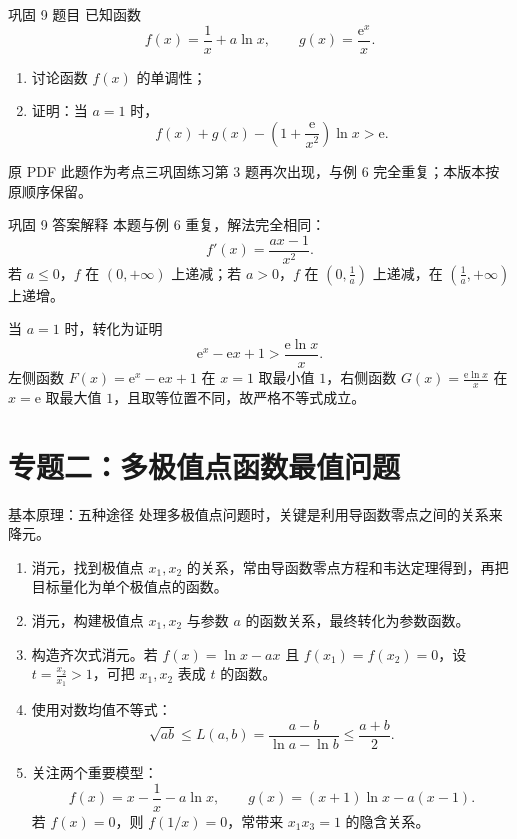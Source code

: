 ﻿\documentclass[aspectratio=169,10pt]{ctexbeamer}
\newcommand{\e}{\mathrm e}
\newcommand{\ocrnote}[1]{\par\medskip{\color{Warn}\bfseries 原文校验说明：}#1}
\begin{document}
\begin{frame}{巩固 9 题目}
\small
已知函数
\[
f(x)=\frac1x+a\ln x,\qquad g(x)=\frac{\e^x}{x}.
\]
\begin{enumerate}
  \item 讨论函数 $f(x)$ 的单调性；
  \item 证明：当 $a=1$ 时，
  \[
  f(x)+g(x)-\left(1+\frac{\e}{x^2}\right)\ln x>\e.
  \]
\end{enumerate}
\ocrnote{原 PDF 此题作为考点三巩固练习第 3 题再次出现，与例 6 完全重复；本版本按原顺序保留。}
\end{frame}

\begin{frame}{巩固 9 答案解释}
\small
本题与例 6 重复，解法完全相同：
\[
f'(x)=\frac{ax-1}{x^2}.
\]
若 $a\le0$，$f$ 在 $(0,+\infty)$ 上递减；若 $a>0$，$f$ 在 $(0,\frac1a)$ 上递减，在 $(\frac1a,+\infty)$ 上递增。

当 $a=1$ 时，转化为证明
\[
\e^x-\e x+1>\frac{\e\ln x}{x}.
\]
左侧函数 $F(x)=\e^x-\e x+1$ 在 $x=1$ 取最小值 $1$，右侧函数 $G(x)=\frac{\e\ln x}{x}$ 在 $x=\e$ 取最大值 $1$，且取等位置不同，故严格不等式成立。
\end{frame}

\section{专题二：多极值点函数最值问题}

\begin{frame}[allowframebreaks]{基本原理：五种途径}
\small
处理多极值点问题时，关键是利用导函数零点之间的关系来降元。

\begin{enumerate}
  \item 消元，找到极值点 $x_1,x_2$ 的关系，常由导函数零点方程和韦达定理得到，再把目标量化为单个极值点的函数。
  \item 消元，构建极值点 $x_1,x_2$ 与参数 $a$ 的函数关系，最终转化为参数函数。
  \item 构造齐次式消元。若 $f(x)=\ln x-ax$ 且 $f(x_1)=f(x_2)=0$，设 $t=\frac{x_2}{x_1}>1$，可把 $x_1,x_2$ 表成 $t$ 的函数。
  \item 使用对数均值不等式：
  \[
  \sqrt{ab}\le L(a,b)=\frac{a-b}{\ln a-\ln b}\le\frac{a+b}{2}.
  \]
  \item 关注两个重要模型：
  \[
  f(x)=x-\frac1x-a\ln x,\qquad
  g(x)=(x+1)\ln x-a(x-1).
  \]
  若 $f(x)=0$，则 $f(1/x)=0$，常带来 $x_1x_3=1$ 的隐含关系。
\end{enumerate}
\end{frame}
\end{document}
